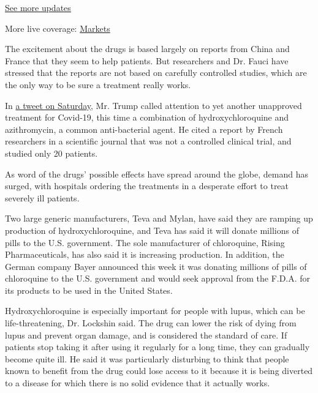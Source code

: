 \href{https://www.nytimes3xbfgragh.onion/2020/08/04/world/coronavirus-cases.html?action=click\&pgtype=Article\&state=default\&region=MAIN_CONTENT_1\&context=storylines_live_updates}{See
more updates}

More live coverage:
\href{https://www.nytimes3xbfgragh.onion/live/2020/08/04/business/stock-market-today-coronavirus?action=click\&pgtype=Article\&state=default\&region=MAIN_CONTENT_1\&context=storylines_live_updates}{Markets}

The excitement about the drugs is based largely on reports from China
and France that they seem to help patients. But researchers and Dr.
Fauci have stressed that the reports are not based on carefully
controlled studies, which are the only way to be sure a treatment really
works.

In
\href{https://twitter.com/realDonaldTrump/status/1241367239900778501}{a
tweet on Saturday}, Mr. Trump called attention to yet another unapproved
treatment for Covid-19, this time a combination of hydroxychloroquine
and azithromycin, a common anti-bacterial agent. He cited a report by
French researchers in a scientific journal that was not a controlled
clinical trial, and studied only 20 patients.

As word of the drugs' possible effects have spread around the globe,
demand has surged, with hospitals ordering the treatments in a desperate
effort to treat severely ill patients.

Two large generic manufacturers, Teva and Mylan, have said they are
ramping up production of hydroxychloroquine, and Teva has said it will
donate millions of pills to the U.S. government. The sole manufacturer
of chloroquine, Rising Pharmaceuticals, has also said it is increasing
production. In addition, the German company Bayer announced this week it
was donating millions of pills of chloroquine to the U.S. government and
would seek approval from the F.D.A. for its products to be used in the
United States.

Hydroxychloroquine is especially important for people with lupus, which
can be life-threatening, Dr. Lockshin said. The drug can lower the risk
of dying from lupus and prevent organ damage, and is considered the
standard of care. If patients stop taking it after using it regularly
for a long time, they can gradually become quite ill. He said it was
particularly disturbing to think that people known to benefit from the
drug could lose access to it because it is being diverted to a disease
for which there is no solid evidence that it actually works.

